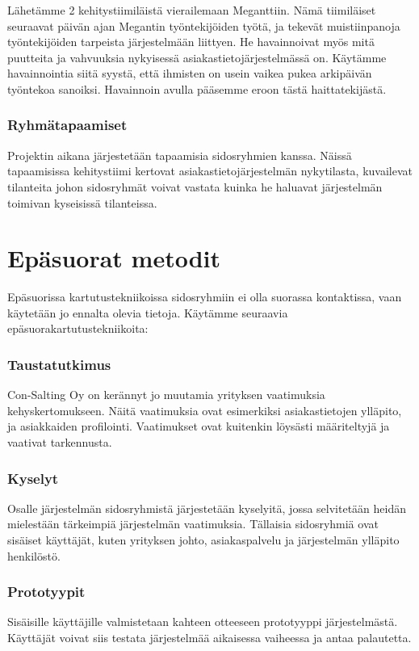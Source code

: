             Lähetämme 2 kehitystiimiläistä vierailemaan  Meganttiin. Nämä tiimiläiset seuraavat päivän ajan Megantin työntekijöiden työtä, ja tekevät 
            muistiinpanoja työntekijöiden tarpeista järjestelmään liittyen. He havainnoivat myös mitä puutteita ja vahvuuksia nykyisessä asiakastietojärjestelmässä on.
            Käytämme havainnointia siitä syystä, että ihmisten on usein vaikea pukea arkipäivän työntekoa sanoiksi. Havainnoin avulla pääsemme eroon tästä haittatekijästä.


        \subsubsection*{Ryhmätapaamiset}

            Projektin aikana järjestetään tapaamisia sidosryhmien kanssa. Näissä tapaamisissa kehitystiimi kertovat asiakastietojärjestelmän nykytilasta, kuvailevat tilanteita 
            johon sidosryhmät voivat vastata kuinka he haluavat järjestelmän toimivan kyseisissä tilanteissa.


    \section*{Epäsuorat metodit}

        Epäsuorissa kartutustekniikoissa sidosryhmiin ei olla suorassa kontaktissa, vaan käytetään jo ennalta olevia tietoja.
        Käytämme seuraavia epäsuorakartutustekniikoita:

        \subsubsection*{Taustatutkimus}

        Con-Salting Oy on kerännyt jo muutamia yrityksen vaatimuksia kehyskertomukseen. 
        Näitä vaatimuksia ovat esimerkiksi asiakastietojen ylläpito, ja asiakkaiden profilointi.
        Vaatimukset ovat kuitenkin löysästi määriteltyjä ja vaativat tarkennusta.

        \subsubsection{Kyselyt}

        Osalle järjestelmän sidosryhmistä järjestetään kyselyitä, jossa selvitetään heidän mielestään tärkeimpiä järjestelmän vaatimuksia.
        Tällaisia sidosryhmiä ovat sisäiset käyttäjät, kuten yrityksen johto, asiakaspalvelu ja järjestelmän ylläpito henkilöstö.

        \subsubsection*{Prototyypit}

        Sisäisille käyttäjille valmistetaan kahteen otteeseen prototyyppi järjestelmästä. Käyttäjät voivat siis testata järjestelmää aikaisessa vaiheessa ja antaa palautetta.
